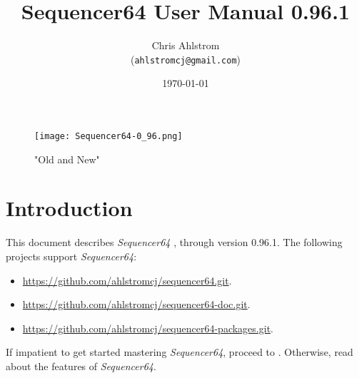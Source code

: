 \documentclass[
 11pt,
 twoside,
 a4paper,
 headinclude,
 footinclude,
 final                                 %
]{article}
\begin{document}
\title{Sequencer64 User Manual 0.96.1}
\author{Chris Ahlstrom \\
   (\texttt{ahlstromcj@gmail.com})}
\date{\today}
\maketitle

\begin{figure}[H]
   \centering 
   \texttt{[image: Sequencer64-0\_96.png]}
   \caption*{"Old and New"}
\end{figure}

\clearpage                             %

\tableofcontents
\listoffigures                         %
\listoftables                          %


\setlength{\parindent}{2em}
\setlength{\parskip}{1ex plus 0.5ex minus 0.2ex}

\section{Introduction}
\label{sec:introduction}

   This document describes \textsl{Sequencer64}
   \cite{sequencer64}, through version 0.96.1.
   The following projects support \textsl{Sequencer64}:

   \begin{itemize}
      \item \url{https://github.com/ahlstromcj/sequencer64.git}.
      \item \url{https://github.com/ahlstromcj/sequencer64-doc.git}.
      \item \url{https://github.com/ahlstromcj/sequencer64-packages.git}.
   \end{itemize}

   If impatient to get started mastering \textsl{Sequencer64},
   proceed to .
   Otherwise, read about the features of \textsl{Sequencer64}.
\end{document}
